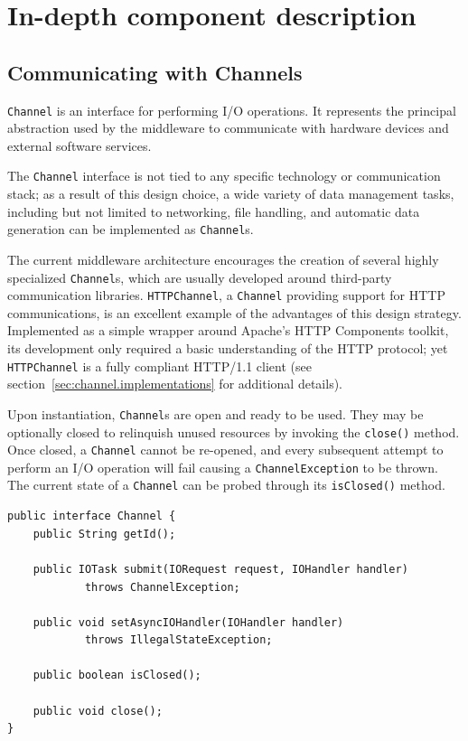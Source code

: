 \chapter{In-depth component description}

\section{Communicating with Channels}

\texttt{Channel} is an interface for performing I/O operations. It represents the principal abstraction used by the middleware to communicate with hardware devices and external software services.

The \texttt{Channel} interface is not tied to any specific technology or communication stack; as a result of this design choice, a wide variety of data management tasks, including but not limited to networking, file handling, and automatic data generation can be implemented as \texttt{Channel}s.

The current middleware architecture encourages the creation of several highly specialized \texttt{Channel}s, which are usually developed around third-party communication libraries. \texttt{HTTPChannel}, a \texttt{Channel} providing support for HTTP communications, is an excellent example of the advantages of this design strategy. Implemented as a simple wrapper around Apache's HTTP Components toolkit, its development only required a basic understanding of the HTTP protocol; yet \texttt{HTTPChannel} is a fully compliant HTTP/1.1 client (see section~\ref{sec:channel.implementations} for additional details).

Upon instantiation, \texttt{Channel}s are open and ready to be used. They may be optionally closed to relinquish unused resources by invoking the \texttt{close()} method. Once closed, a \texttt{Channel} cannot be re-opened, and every subsequent attempt to perform an I/O operation will fail causing a \texttt{ChannelException} to be thrown. The current state of a \texttt{Channel} can be probed through its \texttt{isClosed()} method.

\lstset{language=Java}
\begin{lstlisting}[float,floatplacement=H,caption=The Channel interface,label={lst:channel}]
public interface Channel {
	public String getId();
	
	public IOTask submit(IORequest request, IOHandler handler)
			throws ChannelException;
	
	public void setAsyncIOHandler(IOHandler handler)
			throws IllegalStateException;
			
	public boolean isClosed();
	
	public void close();		
}
\end{lstlisting}

